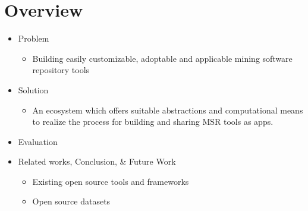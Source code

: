 \section{Overview}
    \begin{frame}
        \begin{itemize}
            \item Problem
            \begin{itemize}
                \item Building easily customizable, adoptable and applicable mining software repository tools
            \end{itemize}

            \item Solution
            \begin{itemize}
                \item An ecosystem which offers suitable abstractions and computational means to realize the process for building and sharing MSR tools as apps.
            \end{itemize}


            \item Evaluation

            \item Related works, Conclusion, \& Future Work
              \begin{itemize}
                \item Existing open source tools and frameworks
                \item Open source datasets
              \end{itemize}
        \end{itemize}
    \end{frame}
